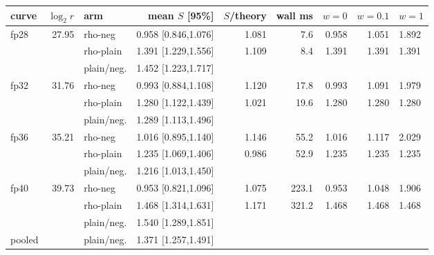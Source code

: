 \begin{tabular}{@{}lrlrrrrrl@{}}
\toprule
curve & $\log_2 r$ & arm & mean $S$ [95\%] & $S$/theory & wall ms & $w=0$ & $w=0.1$ & $w=1$ \\
\midrule
fp28 & 27.95 & rho-neg & 0.958 [0.846,1.076] & 1.081 & 7.6 & 0.958 & 1.051 & 1.892 \\
 &  & rho-plain & 1.391 [1.229,1.556] & 1.109 & 8.4 & 1.391 & 1.391 & 1.391 \\
 & & plain/neg. & 1.452 [1.223,1.717] & & & & & \\
\addlinespace
fp32 & 31.76 & rho-neg & 0.993 [0.884,1.108] & 1.120 & 17.8 & 0.993 & 1.091 & 1.979 \\
 &  & rho-plain & 1.280 [1.122,1.439] & 1.021 & 19.6 & 1.280 & 1.280 & 1.280 \\
 & & plain/neg. & 1.289 [1.113,1.496] & & & & & \\
\addlinespace
fp36 & 35.21 & rho-neg & 1.016 [0.895,1.140] & 1.146 & 55.2 & 1.016 & 1.117 & 2.029 \\
 &  & rho-plain & 1.235 [1.069,1.406] & 0.986 & 52.9 & 1.235 & 1.235 & 1.235 \\
 & & plain/neg. & 1.216 [1.013,1.450] & & & & & \\
\addlinespace
fp40 & 39.73 & rho-neg & 0.953 [0.821,1.096] & 1.075 & 223.1 & 0.953 & 1.048 & 1.906 \\
 &  & rho-plain & 1.468 [1.314,1.631] & 1.171 & 321.2 & 1.468 & 1.468 & 1.468 \\
 & & plain/neg. & 1.540 [1.289,1.851] & & & & & \\
\addlinespace
pooled & & plain/neg. & 1.371 [1.257,1.491] & & & & & \\
\bottomrule
\end{tabular}
